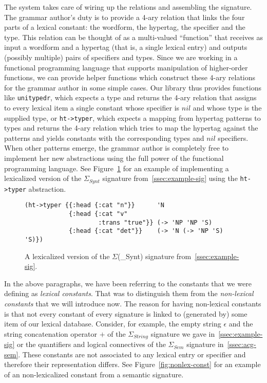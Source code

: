 The system takes care of wiring up the relations and assembling the
signature. The grammar author's duty is to provide a 4-ary relation that
links the four parts of a lexical constant: the wordform, the hypertag,
the specifier and the type. This relation can be thought of as a
multi-valued ``function'' that receives as input a wordform and a
hypertag (that is, a single lexical entry) and outputs (possibly
multiple) pairs of specifiers and types. Since we are working in a
functional programming language that supports manipulation of
higher-order functions, we can provide helper functions which construct
these 4-ary relations for the grammar author in some simple cases. Our
library thus provides functions like \texttt{unitypedr}, which expects a
type and returns the 4-ary relation that assigns to every lexical item a
single constant whose specifier is $nil$ and whose type is the supplied
type, or \texttt{ht->typer}, which expects a mapping from hypertag
patterns to types and returns the 4-ary relation which tries to map the
hypertag against the patterns and yields constants with the
corresponding types and $nil$ specifiers. When other patterns emerge,
the grammar author is completely free to implement her new abstractions
using the full power of the functional programming language. See
Figure~\ref{fig:lex-sig-impl} for an example of implementing a
lexicalized version of the $\Sigma_{Synt}$ signature
from~\ref{ssec:example-sig} using the \texttt{ht->typer} abstraction.

\begin{figure}
  \centering
\begin{verbatim}
(ht->typer {{:head {:cat "n"}}      'N
            {:head {:cat "v"
                    :trans "true"}} (-> 'NP 'NP 'S)
            {:head {:cat "det"}}    (-> 'N (-> 'NP 'S) 'S)})
\end{verbatim}
  \caption{\label{fig:lex-sig-impl} A lexicalized version of the
    $\Sigma$(\_{Synt}) signature from~\ref{ssec:example-sig}.}
\end{figure}

In the above paragraphs, we have been referring to the constants that we
were defining as \emph{lexical constants}. That was to distinguish them
from the \emph{non-lexical constants} that we will introduce now. The
reason for having non-lexical constants is that not every constant of
every signature is linked to (generated by) some item of our lexical
database. Consider, for example, the empty string $\epsilon$ and the
string concatenation operator $+$ of the $\Sigma_{String}$ signature we
gave in~\ref{ssec:example-sig} or the quantifiers and logical
connectives of the $\Sigma_{Sem}$ signature in~\ref{ssec:acg-sem}.
These constants are not associated to any lexical entry or specifier and
therefore their representation differs. See
Figure~\ref{fig:nonlex-const} for an example of an non-lexicalized
constant from a semantic signature.

